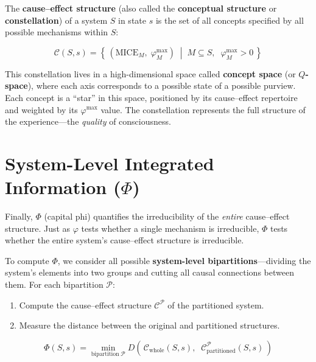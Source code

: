 \documentclass[11pt,a4paper]{report}
\newcommand{\Phi}{\varPhi}
\newcommand{\phimax}{\varphi^{\mathrm{max}}}
\newcommand{\MICE}{\mathrm{MICE}}
\begin{document}
The \textbf{cause--effect structure} (also called the \textbf{conceptual structure} or \textbf{constellation}) of a system $S$ in state $s$ is the set of all concepts specified by all possible mechanisms within $S$:

\begin{mathbox}
\vspace{-8pt}
\[
  \mathcal{C}(S, s) = \left\{\, \left(\MICE_M,\; \phimax_M\right) \;\middle|\; M \subseteq S,\;\; \phimax_M > 0 \,\right\}
\]
\vspace{-10pt}
\end{mathbox}

This constellation lives in a high-dimensional space called \textbf{concept space} (or \textbf{$Q$-space}), where each axis corresponds to a possible state of a possible purview. Each concept is a ``star'' in this space, positioned by its cause--effect repertoire and weighted by its $\phimax$ value. The constellation represents the full structure of the experience---the \emph{quality} of consciousness.

\section{System-Level Integrated Information ($\Phi$)}

Finally, $\Phi$ (capital phi) quantifies the irreducibility of the \emph{entire} cause--effect structure. Just as $\varphi$ tests whether a single mechanism is irreducible, $\Phi$ tests whether the entire system's cause--effect structure is irreducible.

To compute $\Phi$, we consider all possible \textbf{system-level bipartitions}---dividing the system's elements into two groups and cutting all causal connections between them. For each bipartition $\mathcal{P}$:
\begin{enumerate}[leftmargin=2em]
  \item Compute the cause--effect structure $\mathcal{C}^{\mathcal{P}}$ of the partitioned system.
  \item Measure the distance between the original and partitioned structures.
\end{enumerate}

\begin{mathbox}
\vspace{-8pt}
\[
  \boxed{\;\Phi(S, s) = \min_{\text{bipartition}\;\mathcal{P}} D\!\left(\, \mathcal{C}_{\text{whole}}(S, s),\;\; \mathcal{C}_{\text{partitioned}}^{\mathcal{P}}(S, s)\,\right)\;}
\]
\vspace{-10pt}
\end{mathbox}
\end{document}
